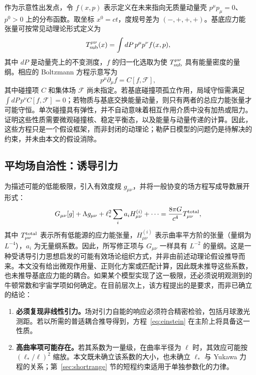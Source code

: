 \documentclass[UTF8,fontset=none,11pt,a4paper]{ctexart}
\begin{document}
作为示意性出发点，令 $f(x,p)$ 表示定义在未来指向无质量动量壳 $p^\mu p_\mu=0$、$p^0>0$ 上的分布函数。取坐标 $x^0=ct$，度规号差为 $(-,+,+,+)$。基底应力能张量可按常见动理论形式定义为
\begin{equation}
T_{\rm sub}^{\mu\nu}(x)=\int dP\,p^\mu p^\nu f(x,p),
\end{equation}
其中 $dP$ 是动量壳上的不变测度，$f$ 的归一化选取为使 $T_{\rm sub}^{\mu\nu}$ 具有能量密度的量纲。相应的 Boltzmann 方程示意写为
\begin{equation}
p^\mu\partial_\mu f=C[f,\mathcal{F}],
\end{equation}
其中碰撞项 $C$ 和集体场 $\mathcal{F}$ 尚未指定。若基底碰撞项孤立作用，局域守恒需满足\allowbreak $\int dP\,p^\nu C[f,\mathcal{F}]=0$；若物质与基底交换能量动量，则只有两者的总应力能张量才可能守恒。单次碰撞具有弹性，并不自动意味着相互作用介质中没有加热或阻力。证明这些性质需要微观碰撞核、稳定平衡态，以及能量与动量传递的计算。因此，这些方程只是一个假设框架，而非封闭的动理论；勒萨日模型的问题仍是待解决的约束，并未由本文的假设消除。

\subsection{平均场自洽性：诱导引力}\label{sec:induced}

为描述可能的低能极限，引入有效度规 $g_{\mu\nu}$，并将一般协变的场方程写成导数展开形式：
\begin{equation}
G_{\mu\nu}[g]+\Lambda g_{\mu\nu}
+\ell_\ast^2\sum_i a_i H_{\mu\nu}^{(i)}+\cdots
=\frac{8\pi G}{c^4}T_{\mu\nu}^{\rm total},
\label{eq:einstein}
\end{equation}
其中 $T_{\mu\nu}^{\rm total}$ 表示所有低能源的应力能张量，$H_{\mu\nu}^{(i)}$ 表示曲率平方阶的张量（量纲为 $L^{-4}$），$a_i$ 为无量纲系数。因此，所写修正项与 $G_{\mu\nu}$ 一样具有 $L^{-2}$ 的量纲。这是一种受诱导引力思想启发的可能有效场论组织方式\cite{Sakharov1968,Donoghue1994}，并非由前述动理论假设推导而来。本文没有给出微观作用量、正则化方案或匹配计算，因此既未推导这些系数，也未推导基底应力能的耦合。如果某个模型实现了这一极限，还必须说明观测到的牛顿常数和宇宙学项如何确定。在目前层次上，该方程提出的是要求，而非已确立的结论：
\begin{enumerate}
\item \textbf{必须复现非线性引力。}场对引力自能的响应必须符合精密检验，包括月球激光测距\cite{Williams2004}。若以所需的普适耦合推导得到，方程~\eqref{eq:einstein} 在主阶上将具备这一性质。
\item \textbf{高曲率项可能存在。}若其系数为一量级，在曲率半径为 $\ell$ 时，其效应可能按 $(\ell_\ast/\ell)^2$ 缩放。本文既未确立该系数的大小，也未确立 $\ell_\ast$ 与 Yukawa 力程的关系；第~\ref{sec:shortrange} 节的短程约束适用于单独参数化的力律。
\end{enumerate}
\end{document}
